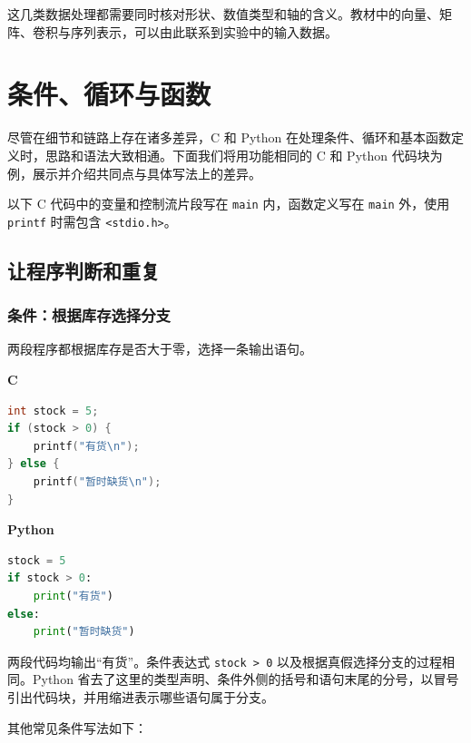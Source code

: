 \documentclass[UTF8,a4paper,11pt,fontset=fandol]{ctexart}
\providecommand{\passthrough}[1]{#1}
\begin{document}
这几类数据处理都需要同时核对形状、数值类型和轴的含义。教材中的向量、矩阵、卷积与序列表示，可以由此联系到实验中的输入数据。

\clearpage

\section{条件、循环与函数}\label{ux6761ux4ef6ux5faaux73afux4e0eux51fdux6570}

尽管在细节和链路上存在诸多差异，C 和 Python 在处理条件、循环和基本函数定义时，思路和语法大致相通。下面我们将用功能相同的 C 和 Python 代码块为例，展示并介绍共同点与具体写法上的差异。

以下 C 代码中的变量和控制流片段写在 \passthrough{\lstinline!main!} 内，函数定义写在 \passthrough{\lstinline!main!} 外，使用 \passthrough{\lstinline!printf!} 时需包含 \passthrough{\lstinline!<stdio.h>!}。

\subsection{让程序判断和重复}\label{ux8ba9ux7a0bux5e8fux5224ux65adux548cux91cdux590d}

\subsubsection{条件：根据库存选择分支}\label{ux6761ux4ef6ux6839ux636eux5e93ux5b58ux9009ux62e9ux5206ux652f}

两段程序都根据库存是否大于零，选择一条输出语句。

\textbf{C}

\begin{lstlisting}[language=C]
int stock = 5;
if (stock > 0) {
    printf("有货\n");
} else {
    printf("暂时缺货\n");
}
\end{lstlisting}

\textbf{Python}

\begin{lstlisting}[language=Python]
stock = 5
if stock > 0:
    print("有货")
else:
    print("暂时缺货")
\end{lstlisting}

两段代码均输出``有货''。条件表达式 \passthrough{\lstinline!stock > 0!} 以及根据真假选择分支的过程相同。Python 省去了这里的类型声明、条件外侧的括号和语句末尾的分号，以冒号引出代码块，并用缩进表示哪些语句属于分支。

其他常见条件写法如下：
\end{document}
